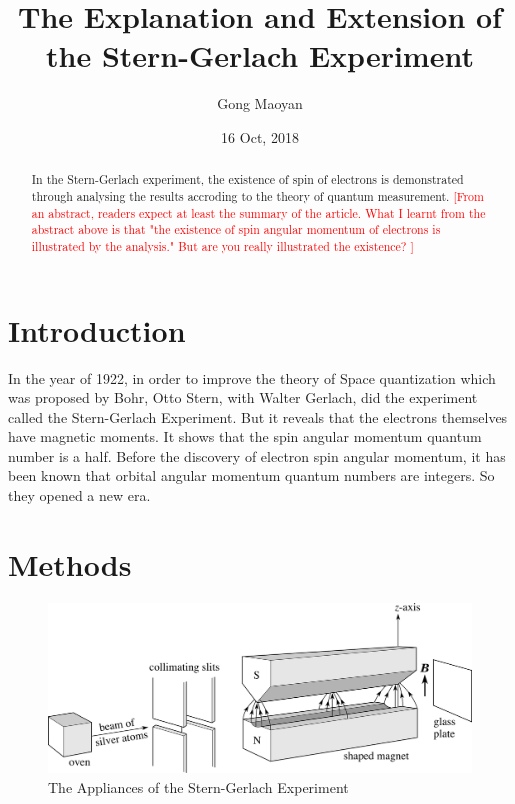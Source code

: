 \documentclass[a4paper]{article}
\begin{document}
\title{The Explanation and Extension of the Stern-Gerlach Experiment}
\author{Gong Maoyan}
\date{16 Oct, 2018}
\maketitle



\begin{abstract}
In the Stern-Gerlach experiment, the existence of spin of electrons is demonstrated through analysing the results accroding to the theory of quantum measurement.
\textcolor{red}{[From an abstract, readers expect at least the summary of the article. What I learnt from the abstract above is that "the existence of spin angular momentum of electrons is illustrated by the analysis." But are you really illustrated the existence? ]}
\end{abstract}

\section{Introduction}
\quad In the year of 1922, in order to improve the theory of Space quantization which was proposed by Bohr, Otto Stern, with Walter Gerlach, did the experiment called the Stern-Gerlach Experiment. But it reveals that the electrons themselves have magnetic moments. It shows that the spin angular momentum quantum number is a half. Before the discovery of electron spin angular momentum, it has been known that orbital angular momentum quantum numbers are integers. So they opened a new era.

\section{Methods}

\begin{figure}[htbp!] \label{Appliances}
\centering %
    \includegraphics[width=1.0\linewidth]{Appliances.png}
    \caption{The Appliances of the Stern-Gerlach Experiment}
\end{figure}
\end{document}
